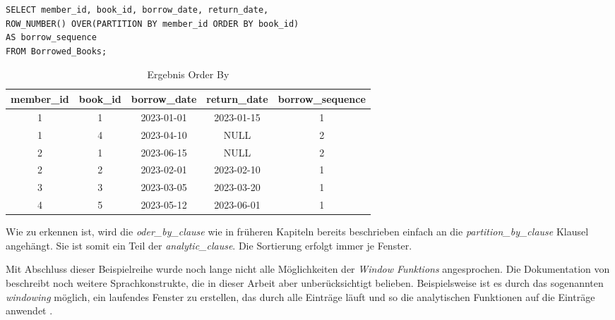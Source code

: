 \begin{lstlisting}
SELECT member_id, book_id, borrow_date, return_date,
ROW_NUMBER() OVER(PARTITION BY member_id ORDER BY book_id)
AS borrow_sequence
FROM Borrowed_Books;
\end{lstlisting}
\begin{table}[h]
	\centering
	\begin{tabular}{|c|c|c|c|c|}
		\hline
		\textbf{member\_id} & \textbf{book\_id} & \textbf{borrow\_date} & \textbf{return\_date} & \textbf{borrow\_sequence} \\
		\hline
		1                   & 1                 & 2023-01-01            & 2023-01-15            & 1                         \\
		\hline
		1                   & 4                 & 2023-04-10            & NULL                  & 2                         \\
		\hline
		2                   & 1                 & 2023-06-15            & NULL                  & 2                         \\
		\hline
		2                   & 2                 & 2023-02-01            & 2023-02-10            & 1                         \\
		\hline
		3                   & 3                 & 2023-03-05            & 2023-03-20            & 1                         \\
		\hline
		4                   & 5                 & 2023-05-12            & 2023-06-01            & 1                         \\
		\hline
	\end{tabular}
	\caption{Ergebnis Order By}
	\label{tab:ergebnis_oder_by}
\end{table}

Wie zu erkennen ist, wird die \textit{oder\_by\_clause} wie in früheren Kapiteln
bereits beschrieben einfach an die \textit{partition\_by\_clause} Klausel angehängt.
Sie ist somit ein Teil der \textit{analytic\_clause}. Die Sortierung erfolgt
immer je Fenster.

Mit Abschluss dieser Beispielreihe wurde noch lange nicht alle Möglichkeiten der
\textit{Window Funktions} angesprochen. Die Dokumentation von \citet{oracle} beschreibt
noch weitere Sprachkonstrukte, die in dieser Arbeit aber unberücksichtigt
belieben. Beispielsweise ist es durch das sogenannten \textit{windowing} möglich,
ein laufendes Fenster zu erstellen, das durch alle Einträge läuft und so die
analytischen Funktionen auf die Einträge anwendet \citep[vgl.][]{oracle}.

